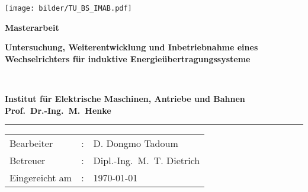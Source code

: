 
\thispagestyle{empty}
\selectfont
 
\hspace{-0.5cm}
\texttt{[image: bilder/TU\_BS\_IMAB.pdf]}

\begin{center}

\vspace{4cm} 												%
{\large \textbf{Masterarbeit}} %

\vspace{3cm} 												%

\parbox{0.9\textwidth}{
  \begin{center}
    \huge \textbf{
      Untersuchung, Weiterentwicklung und Inbetriebnahme eines Wechselrichters für induktive Energieübertragungssysteme 
			}
  \end{center}
  }\\
\vspace{3cm} 												%
\parbox{0.7\textwidth}{
  \begin{center}
     \textbf{
      Institut für Elektrische Maschinen, Antriebe und Bahnen\\[1.2ex]
      Prof.~Dr.-Ing.~M.~Henke}
  \end{center}
  }
\vfill

\hrule

\vspace{1cm}

{\fontsize{12pt}{12} \selectfont%
\begin{tabular}{lcl}
Bearbeiter &:& D. Dongmo Tadoum\\[0.5ex]
Betreuer &:& Dipl.-Ing.~M.~T. Dietrich\\[0.5ex]
Eingereicht am &:& \today
\end{tabular}
}
\end{center}
\normalsize
\newpage
